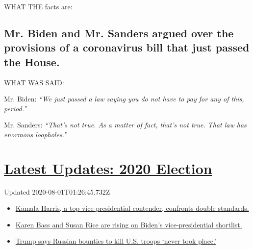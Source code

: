 WHAT THE facts are:

\hypertarget{mr-biden-and-mr-sanders-argued-over-the-provisions-of-a-coronavirus-bill-that-just-passed-the-house}{%
\subsection{Mr. Biden and Mr. Sanders argued over the provisions of a
coronavirus bill that just passed the
House.}\label{mr-biden-and-mr-sanders-argued-over-the-provisions-of-a-coronavirus-bill-that-just-passed-the-house}}

WHAT WAS SAID:

Mr. Biden: \emph{``We just passed a law saying you do not have to pay
for any of this, period.''}

Mr. Sanders: \emph{``That's not true. As a matter of fact, that's not
true. That law has enormous loopholes.''}

\hypertarget{latest-updates-2020-election}{%
\section{\texorpdfstring{\href{https://www.nytimes.com/2020/07/31/us/elections/biden-vs-trump.html?action=click\&pgtype=Article\&state=default\&region=MAIN_CONTENT_1\&context=storylines_live_updates}{Latest
Updates: 2020
Election}}{Latest Updates: 2020 Election}}\label{latest-updates-2020-election}}

Updated 2020-08-01T01:26:45.732Z

\begin{itemize}
\tightlist
\item
  \href{https://www.nytimes.com/2020/07/31/us/elections/biden-vs-trump.html?action=click\&pgtype=Article\&state=default\&region=MAIN_CONTENT_1\&context=storylines_live_updates\#link-29fdff45}{Kamala
  Harris, a top vice-presidential contender, confronts double
  standards.}
\item
  \href{https://www.nytimes.com/2020/07/31/us/elections/biden-vs-trump.html?action=click\&pgtype=Article\&state=default\&region=MAIN_CONTENT_1\&context=storylines_live_updates\#link-13ec3d9c}{Karen
  Bass and Susan Rice are rising on Biden's vice-presidential
  shortlist.}
\item
  \href{https://www.nytimes.com/2020/07/31/us/elections/biden-vs-trump.html?action=click\&pgtype=Article\&state=default\&region=MAIN_CONTENT_1\&context=storylines_live_updates\#link-49e9a016}{Trump
  says Russian bounties to kill U.S. troops `never took place.'}
\end{itemize}

